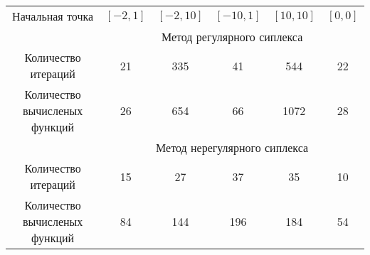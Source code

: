 \documentclass[12pt, a4paper]{article}
\begin{document}
\begin{table}[!h]
	\centering
	\begin{tabular}[c]{|c|c|c|c|c|c|}
		\hline
		\multirow{2}{2.8cm}{Начальная точка}& \multirow{2}{2.25cm}{$[-2,1]$}&  \multirow{2}{2,25cm}{$[-2,10]$}&
		\multirow{2}{2,25cm}{$[-10,1]$}&\multirow{2}{2,25cm}{$[10,10]$} &
		\multirow{2}{2,25cm}{$[0,0]$}
		\\ & & & & &  \\  \hline  & \multicolumn{5}{c|}{Метод регулярного сиплекса} \\ \hline  
		\multirow{3}{2.8cm}{Количество итераций}& \multirow{3}{2,25cm}{21}&  \multirow{3}{2,25cm}{335}&
		\multirow{3}{2,25cm}{41}&\multirow{3}{2,25cm}{544} &
		\multirow{3}{2,25cm}{22}
		\\ & & & & & \\ & & & & &   \\ \hline
		\multirow{3}{2.8cm}{Количество вычисленых функций}& \multirow{3}{2,25cm}{26}&  \multirow{3}{2,25cm}{654}&
		\multirow{3}{2,25cm}{66}&\multirow{3}{2,25cm}{1072} &
		\multirow{3}{2,25cm}{28}
		\\ & & & & &  	\\ & & & & &\\ \hline
		  &
		\multicolumn{5}{c|}{Метод нерегулярного сиплекса} \\ \hline  
			\multirow{3}{2.8cm}{Количество итераций}& \multirow{3}{2,25cm}{15}&  \multirow{3}{2,25cm}{27}&
			\multirow{3}{2,25cm}{37}&\multirow{3}{2,25cm}{35} &
			\multirow{3}{2,25cm}{10}
		\\ & & & & & \\ & & & & &   \\ \hline
		\multirow{3}{2.8cm}{Количество вычисленых функций}& \multirow{3}{2,25cm}{84}&  \multirow{3}{2,25cm}{144}&
		\multirow{3}{2,25cm}{196}&\multirow{3}{2,25cm}{184} &
		\multirow{3}{2,25cm}{54}
		\\ & & & & &  	\\ & & & & &\\ \hline
	
		
	\end{tabular}
	\centering{}
	\caption{}
\end{table}
\end{document}
